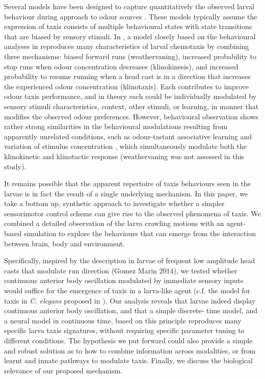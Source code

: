 \documentclass[11pt,a4paper]{article}
\newcommand{\todoBW}[1]{\todo[author=BW,color=orange, size=\tiny,inline]{1}}
\begin{document}
Several models have been designed to capture quantitatively the observed larval behaviour during approach to odour sources  \citep{davies2015model,hernandez2015reverse,schleyer2015learning,gepner2015computations}. These models typically assume the expression of taxis consists of multiple behavioural states with state transitions that are biased by sensory stimuli. In \cite{davies2015model}, a model closely based on the behavioural analyses in
 \citet{lahiri2011two,gomez2014multilevel,gomez2011active} reproduces many characteristics of larval chemotaxis by combining three mechanisms: biased forward runs (weathervaning), increased probability to stop runs when odour concentration decreases (klinokinesis), and increased probability to resume running when a head cast is in a direction that increases the experienced odour concentration (klinotaxis). Each contributes to improve odour taxis performance, and in theory each could be individually modulated by sensory stimuli characteristics, context, other stimuli, or learning, in manner that modifies the observed odour preferences. 
However, behavioural observation shows rather strong similarities in the behavioural modulations resulting from apparently unrelated conditions, such as odour-tastant associative learning and variation of stimulus concentration \citep{schleyer2015learning}, which simultaneously modulate both the klinokinetic and klinotactic response (weathervaning was not assessed in this study).

It remains possible that the apparent repertoire of taxis behaviours seen in the larvae is in fact the result of a single underlying mechanism. In this paper, we take a bottom up, synthetic approach \citep{braitenberg1986vehicles} to investigate whether a simpler sensorimotor control scheme can give rise to the observed phenomena of taxis. We combined a detailed observation of the larva crawling motions with an agent-based simulation to explore the behaviours that can emerge from the interaction between brain, body and environment.

Specifically, inspired by the description in larvae of frequent low amplitude head casts that modulate run direction (Gomez Marin 2014), we tested whether continuous anterior body oscillation modulated by immediate sensory inputs would suffice for the emergence of taxis in a larva-like agent (c.f. the model for taxis in {\it C. elegans} proposed in \citet{izquierdo2010evolution}). Our analysis reveals that larvae indeed
display continuous anterior body oscillation, and that a simple discrete- time model, and a neural model in continuous time, based on this principle reproduces many specific larva taxis signatures, without requiring specific parameter tuning to different conditions. The hypothesis we put forward could also provide a simple and robust solution as to how to combine information across modalities, or from learnt and innate pathways to modulate taxis. Finally, we discuss the biological relevance of our proposed mechanism.
\end{document}
